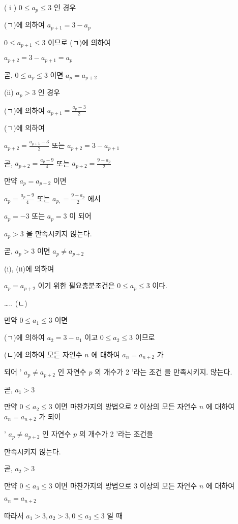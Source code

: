 \documentclass[10pt]{article}
\begin{document}
( i ) \(0 \leq a_{p} \leq 3\) 인 경우

(ㄱ)에 의하여 \(a_{p+1}=3-a_{p}\)

\(0 \leq a_{p+1} \leq 3\) 이므로 (ㄱ)에 의하여

\(a_{p+2}=3-a_{p+1}=a_{p}\)

곧, \(0 \leq a_{p} \leq 3\) 이면 \(a_{p}=a_{p+2}\)

(ii) \(a_{p}>3\) 인 경우

(ㄱ)에 의하여 \(a_{p+1}=\frac{a_{p}-3}{2}\)

(ㄱ)에 의하여

\(a_{p+2}=\frac{a_{p+1}-3}{2}\) 또는 \(a_{p+2}=3-a_{p+1}\)

곧, \(a_{p+2}=\frac{a_{p}-9}{4}\) 또는 \(a_{p+2}=\frac{9-a_{p}}{2}\)

만약 \(a_{p}=a_{p+2}\) 이면

\(a_{p}=\frac{a_{p}-9}{4}\) 또는 \(a_{p,}=\frac{9-a_{p}}{2}\) 에서

\(a_{p}=-3\) 또는 \(a_{p}=3\) 이 되어

\(a_{p}>3\) 을 만족시키지 않는다.

곧, \(a_{p}>3\) 이면 \(a_{p} \neq a_{p+2}\)

(i), (ii)에 의하여

\(a_{p}=a_{p+2}\) 이기 위한 필요충분조건은 \(0 \leq a_{p} \leq 3\) 이다.

….. (ㄴ)

만약 \(0 \leq a_{1} \leq 3\) 이면

(ㄱ)에 의하여 \(a_{2}=3-a_{1}\) 이고 \(0 \leq a_{2} \leq 3\) 이므로

(ㄴ)에 의하여 모든 자연수 \(n\) 에 대하여 \(a_{n}=a_{n+2}\) 가

되어 ' \(a_{p} \neq a_{p+2}\) 인 자연수 \(p\) 의 개수가 2 '라는 조건 을 만족시키지. 않는다.

곧, \(a_{1}>3\)

만약 \(0 \leq a_{2} \leq 3\) 이면 마찬가지의 방법으로 2 이상의 모든 자연수 \(n\) 에 대하여 \(a_{n}=a_{n+2}\) 가 되어

' \(a_{p} \neq a_{p+2}\) 인 자연수 \(p\) 의 개수가 2 '라는 조건을

만족시키지 않는다.

곧, \(a_{2}>3\)

만약 \(0 \leq a_{3} \leq 3\) 이면 마찬가지의 방법으로 3 이상의 모든 자연수 \(n\) 에 대하여

\(a_{n}=a_{n+2}\)

따라서 \(a_{1}>3, a_{2}>3,0 \leq a_{3} \leq 3\) 일 때
\end{document}
